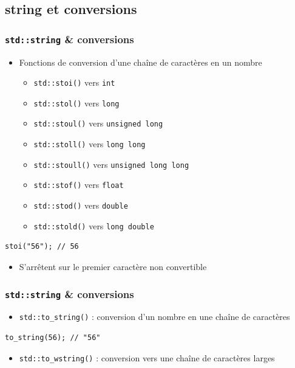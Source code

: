 \documentclass[C++.tex]{subfiles}
\begin{document}
\subsection*{string et conversions}
\begin{frame}[fragile]
	\frametitle{\lstinline|std::string| \& conversions}
	\begin{itemize}
		\item Fonctions de conversion d'une chaîne de caractères en un nombre
		\begin{itemize}
			\item \lstinline|std::stoi()| vers \lstinline|int|
			\item \lstinline|std::stol()| vers \lstinline|long|
			\item \lstinline|std::stoul()| vers \lstinline|unsigned long|
			\item \lstinline|std::stoll()| vers \lstinline|long long|
			\item \lstinline|std::stoull()| vers \lstinline|unsigned long long|
			\item \lstinline|std::stof()| vers \lstinline|float|
			\item \lstinline|std::stod()| vers \lstinline|double|
			\item \lstinline|std::stold()| vers \lstinline|long double|
		\end{itemize}
	\end{itemize}

	\begin{lstlisting}
stoi("56"); // 56\end{lstlisting}

	\begin{itemize}
		\item S'arrêtent sur le premier caractère non convertible
	\end{itemize}
\end{frame}

\begin{frame}[fragile]
	\frametitle{\lstinline|std::string| \& conversions}
	\begin{itemize}
		\item \lstinline|std::to_string()| : conversion d'un nombre en une chaîne de caractères
	\end{itemize}

	\begin{lstlisting}
to_string(56); // "56"\end{lstlisting}

	\begin{itemize}
		\item \lstinline|std::to_wstring()| : conversion vers une chaîne de caractères larges
	\end{itemize}
\end{frame}
\end{document}
